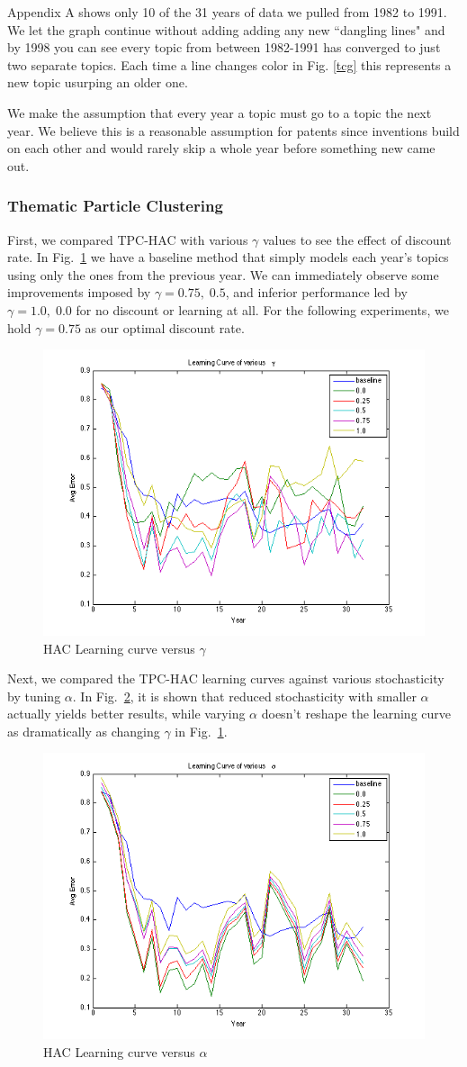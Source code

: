 \documentclass[conference]{IEEEtran}
\begin{document}
Appendix A shows only 10 of the 31 years of data we pulled from 1982 to 1991. We let the graph continue without adding adding any new ``dangling lines" and  by 1998 you can see every topic from between 1982-1991 has converged to just two separate topics. Each time a line changes color in Fig. \ref{tcg} this represents a new topic usurping an older one.

We make the assumption that every year a topic must go to a topic the next year. We believe this is a reasonable assumption for patents since inventions build on each other and would rarely skip a whole year before something new came out.

\subsubsection{Thematic Particle Clustering}

First, we compared TPC-HAC with various $\gamma$ values to see the effect of discount rate. In Fig.~\ref{hac_gamma} we have a baseline method that simply models each year's topics using only the ones from the previous year. We can immediately observe some improvements imposed by $\gamma=0.75,\;0.5$, and inferior performance led by $\gamma=1.0,\;0.0$ for no discount or learning at all. For the following experiments, we hold $\gamma=0.75$ as our optimal discount rate.

\begin{figure}[h]
	\center
	\includegraphics[width=.50\textwidth]{fig/hac_gamma.png}
	\caption{HAC Learning curve versus $\gamma$}
	\label{hac_gamma}
\end{figure}

Next, we compared the TPC-HAC learning curves against various stochasticity by tuning $\alpha$. In Fig.~\ref{hac_alpha}, it is shown that reduced stochasticity with smaller $\alpha$ actually yields better results, while varying $\alpha$ doesn't reshape the learning curve as dramatically as changing $\gamma$ in Fig.~\ref{hac_gamma}.

\begin{figure}[h]
	\center
	\includegraphics[width=.50\textwidth]{fig/hac_alpha.png}
	\caption{HAC Learning curve versus $\alpha$}
	\label{hac_alpha}
\end{figure}
\end{document}
